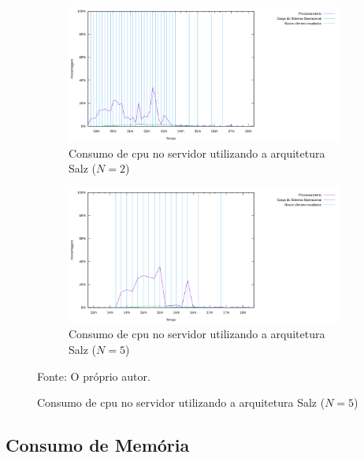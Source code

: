 \begin{figure}[htb!]
  \caption{Consumo de \ac{cpu} no servidor utilizando a arquitetura Salz ($N=2$ e $N=5$)}
  \centering
  \begin{subfigure}{1.0\textwidth}
    \centering
    \includegraphics[width=.9\textwidth]{metricas_salz_t2/cpu.png}
    \caption{Consumo de \ac{cpu} no servidor utilizando a arquitetura Salz ($N=2$)}
    \label{fig:rudy_t5_cpu}
  \end{subfigure}


  \begin{subfigure}{1.0\textwidth}
    \centering
    \includegraphics[width=.9\textwidth]{metricas_salz_t3/cpu.png}
    \caption{Consumo de \ac{cpu} no servidor utilizando a arquitetura Salz ($N=5$)}
    \label{fig:rudy_t6_cpu}
  \end{subfigure}
  \label{fig:rudy_t56_cpu}

  Fonte: O próprio autor.
\end{figure}

\subsection{Consumo de Memória}

